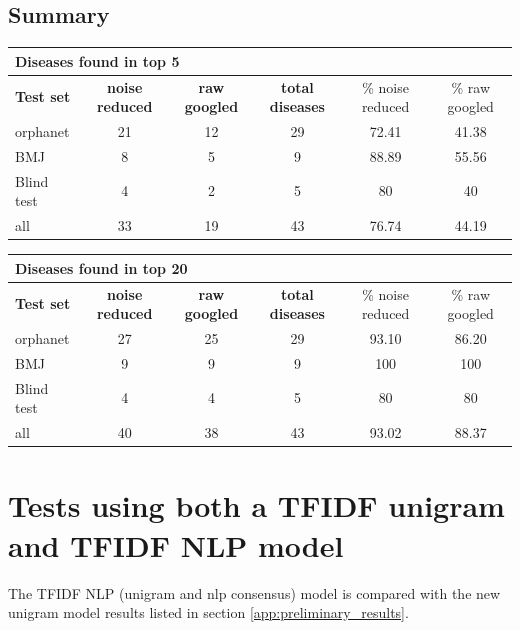 \documentclass[10pt,letterpaper,final]{article}
\begin{document}
\subsection{Summary}
\label{app:summary_raw_reduced}

\begin{center}
\begin{small}
\begin{tabular}{l|cc||ccc}
	\multicolumn{6}{l}{\textbf{Diseases found in top 5}} \\ \hline
\textbf{Test set} & \textbf{noise reduced} &	\textbf{raw googled}	 &	\textbf{total diseases} &	\% noise reduced	 &\% raw googled \\ \hline
orphanet    &    21   &  12    & 29      & 72.41     & 41.38 \\
BMJ	        &    8   &   5   &    9   &  88.89    & 55.56 \\
Blind test	&   4    &   2   &    5   &   80   & 40 \\ \hline \hline
all	        &   33    &   19   &   43    &  76.74    & 44.19 \\ \hline
\end{tabular}
\end{small}
\end{center}

\begin{center}
\begin{small}
\begin{tabular}{l|cc||ccc}
	\multicolumn{6}{l}{\textbf{Diseases found in top 20}} \\ \hline
\textbf{Test set} & \textbf{noise reduced} &	\textbf{raw googled}	 &	\textbf{total diseases} &	\% noise reduced	 &\% raw googled \\ \hline
orphanet    &    27   &   25   &  29     &  93.10    & 86.20\\
BMJ	        &     9  &   9   &    9   &    100  & 100 \\
Blind test	&     4  &   4   &    5   &    80  & 80 \\ \hline \hline
all	        &    40   & 38    &   43    &   93.02   &  88.37 \\ \hline
\end{tabular}
\end{small}
\end{center}


\newpage
\section{Tests using both a TFIDF unigram and TFIDF NLP model}
\label{app:tfidf_tfidfrecalc}
The TFIDF NLP (unigram and nlp consensus) model is compared with the new
unigram model results listed in section \ref{app:preliminary_results}.
\end{document}
